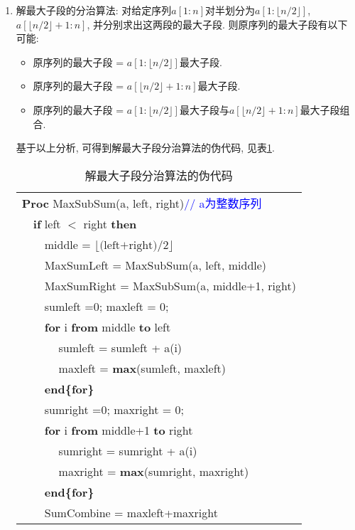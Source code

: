 \begin{solution}
\begin{enumerate}
\item 解最大子段的分治算法: 对给定序列$a[1:n]$对半划分为$a[1:\lfloor n/2\rfloor]$, $a[\lfloor n/2\rfloor+1:n]$, 并分别求出这两段的最大子段. 则原序列的最大子段有以下可能:
    \begin{itemize}
    \item 原序列的最大子段 = $a[1:\lfloor n/2\rfloor]$最大子段.
    \item 原序列的最大子段 = $a[\lfloor n/2\rfloor+1:n]$最大子段.
    \item 原序列的最大子段 = $a[1:\lfloor n/2\rfloor]$最大子段与$a[\lfloor n/2\rfloor+1:n]$最大子段组合.
    \end{itemize}
基于以上分析, 可得到解最大子段分治算法的伪代码, 见表\ref{MaxSubSum}.
\begin{table}[!htb]
\centering
\caption{\label{MaxSubSum}解最大子段分治算法的伪代码}
\begin{tabular}{lllll}
\hline
\multicolumn{5}{l}{\textbf{Proc} MaxSubSum(a, left, right)\textcolor{blue}{// a为整数序列}} \\
 & \multicolumn{4}{l}{\textbf{if} left $<$ right \textbf{then}} \\
 &  & \multicolumn{3}{l}{middle = $\lfloor\textrm{(left+right)}/2\rfloor$} \\
 &  & \multicolumn{3}{l}{MaxSumLeft = MaxSubSum(a, left, middle)} \\
 &  & \multicolumn{3}{l}{MaxSumRight = MaxSubSum(a,  middle+1, right)} \\
 &  & \multicolumn{3}{l}{sumleft =0; maxleft = 0;} \\
 &  & \multicolumn{3}{l}{\textbf{for} i \textbf{from} middle \textbf{to} left} \\
 &  &  & \multicolumn{2}{l}{sumleft = sumleft + a(i)} \\
 &  &  & \multicolumn{2}{l}{maxleft = \textbf{max}(sumleft, maxleft)} \\
 &  & \multicolumn{3}{l}{\textbf{end\{for\}}} \\
 &  & \multicolumn{3}{l}{sumright =0; maxright = 0;} \\
 &  & \multicolumn{3}{l}{\textbf{for} i \textbf{from} middle+1 \textbf{to} right} \\
 &  &  & \multicolumn{2}{l}{sumright = sumright + a(i)} \\
 &  &  & \multicolumn{2}{l}{maxright = \textbf{max}(sumright, maxright)} \\
 &  & \multicolumn{3}{l}{\textbf{end\{for\}}} \\
 &  & \multicolumn{3}{l}{SumCombine = maxleft+maxright}\\

\end{tabular}
\end{table}
\end{enumerate}
\end{solution}
